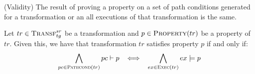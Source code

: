 \begin{proposition}{(Validity) The result of proving a property on a set of path conditions generated for a transformation or an all executions of that transformation is the same.}
\label{prop:proof_validity}

Let $tr\in \textsc{Transf}^{sr}_{tg}$ be a transformation and $p \in \textsc{Property}(tr)$ be a
property of $tr$. Given this, we have that transformation $tr$ satisfies property $p$ if and only if:
\begin{equation}
\label{eq:prop_proof_transf}
\bigwedge_{pc\in \textsc{Pathcond}(tr)} pc\vdash p \hspace{.3cm} \Longleftrightarrow \hspace{.3cm} \bigwedge_{ex\in \textsc{Exec}(tr)}ex\models p
\end{equation}
\end{proposition}
